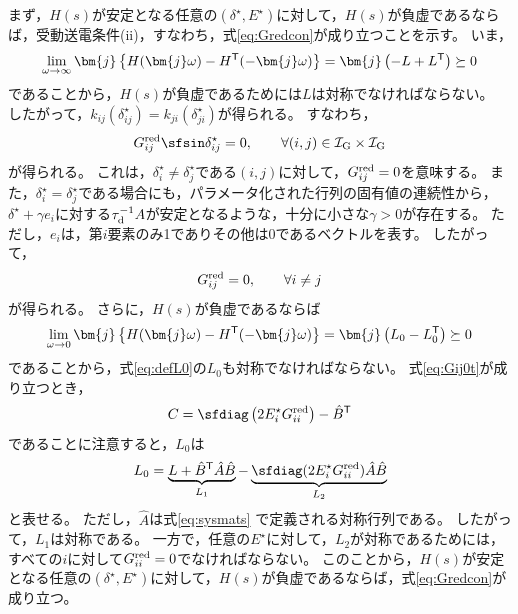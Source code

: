 \documentclass[tombow,dvipdfmx]{corona-a5-1.1}
\begin{document}
\begin{証明}
まず，$H(s)$が安定となる任意の$(\delta^{\star},E^{\star})$に対して，$H(s)$が負虚であるならば，受動送電条件(ii)，すなわち，式\ref{eq:Gredcon}が成り立つことを示す。
いま，
\[
\lim_{\omega \rightarrow \infty} \bm{j}
\left\{
H(\bm{j}\omega)-H^{\sf T}(-\bm{j}\omega)
\right\}
=\bm{j}
\left(
-L+L^{\sf T}
\right) \succeq 0
\]
であることから，$H(s)$が負虚であるためには$L$は対称でなければならない。
したがって，$k_{ij}(\delta_{ij}^{\star}) = k_{ji}(\delta_{ji}^{\star})$が得られる。
すなわち，
\[
G^{\rm red}_{ij} \sfsin \delta_{ij}^{\star} = 0 ,\qquad
\forall (i, j) \in \mathcal{I}_{\rm G} \times \mathcal{I}_{\rm G}
\]
が得られる。
これは，$\delta_{i}^{\star}\neq \delta_{j}^{\star}$である$(i,j)$に対して，$G^{\rm red}_{ij}=0$を意味する。
また，$\delta_{i}^{\star}= \delta_{j}^{\star}$である場合にも，パラメータ化された行列の固有値の連続性から，$\delta^{\star}+\gamma e_i$に対する$\tau_{\rm d}^{-1}A$が安定となるような，十分に小さな$\gamma>0$が存在する。
ただし，$e_i$は，第$i$要素のみ1でありその他は0であるベクトルを表す。
したがって，
\begin{align}\label{eq:Gij0t}
G^{\rm red}_{ij}=0, \qquad
\forall i\neq j
\end{align}
が得られる。
さらに，$H(s)$が負虚であるならば
\[
\lim_{\omega \rightarrow 0} \bm{j}
\left\{
H(\bm{j}\omega)-H^{\sf T}(-\bm{j}\omega)
\right\}
=\bm{j}
\left(
L_0-L_0^{\sf T}
\right) \succeq 0
\]
であることから，式\ref{eq:defL0}の$L_0$も対称でなければならない。
式\ref{eq:Gij0t}が成り立つとき，
\[
C = \sfdiag \left(
2E_i^{\star} G^{\rm red}_{ii}
\right)  - \hat{B}^{\sf T}
\]
であることに注意すると，$L_0$は
\[
L_0 = \underbrace{ L + \hat{B}^{\sf T} \hat{A} \hat{B} }_{L_1}
-
\underbrace{ \sfdiag (
2 E_i^{\star} G^{\rm red}_{ii}
) \hat{A} \hat{B}
}_{L_2}
\]
と表せる。
ただし，$\hat{A}$は式\ref{eq:sysmats}
で定義される対称行列である。
したがって，$L_1$は対称である。
一方で，任意の$E^{\star}$に対して，$L_2$が対称であるためには，すべての$i$に対して$G^{\rm red}_{ii}=0$でなければならない。
このことから，$H(s)$が安定となる任意の$(\delta^{\star},E^{\star})$に対して，$H(s)$が負虚であるならば，式\ref{eq:Gredcon}が成り立つ。



\end{証明}
\end{document}
